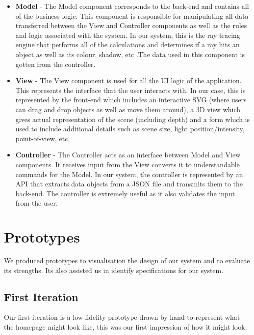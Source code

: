 \documentclass[a4paper]{report}
\begin{document}
	\begin{itemize}
		\item \textbf{Model} - The Model component corresponds to the back-end and contains all of the business logic. This component is responsible for manipulating all data  transferred between the View and Controller components as well as the rules and logic associated with the system. In our system, this is the ray tracing engine that performs all of the calculations and determines if a ray hits an object as well as its colour, shadow, etc \cite{modelstutorial}.The data used in this component is gotten from the controller.\\
		
		\item \textbf{View} - The View component is used for all the UI logic of the application. This represents the interface that the user interacts with. In our case, this is represented by the front-end which includes an interactive SVG (where users can drag and drop objects as well as move them around), a 3D view which gives actual representation of the scene (including depth) and a form which is used to include additional details such as scene size, light position/intensity, point-of-view, etc. \cite{viewstutorial}\\
		
		\item \textbf{Controller} - The Controller acts as an interface between Model and View components. It receives input from the View converts it to understandable commands for the Model. In our system, the controller is represented by an API that extracts data objects from a JSON file and transmits them to the back-end. The controller is extremely useful as it also validates the input from the user. \cite{controllertutorial}
	\end{itemize}
	
	
	\section{Prototypes}
	We produced prototypes to visualisation the design of our system and to evaluate its strengths. Its also assisted us in identify specifications for our system. %
	
	\subsection{First Iteration}
	
	Our first iteration is a low fidelity prototype drawn by hand to represent what the homepage might look like, this was our first impression of how it might look.
	
\end{document}
